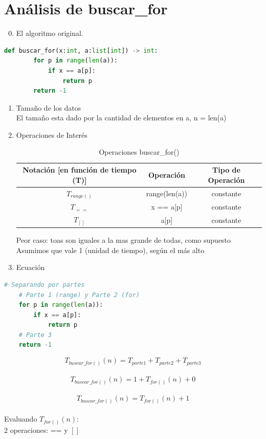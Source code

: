 \documentclass[stu, 12pt, letterpaper, donotrepeattitle, floatsintext, natbib, helv]{apa7}
\begin{document}
\section{Análisis de buscar\_for}
\begin{enumerate}
    \setcounter{enumi}{-1}
    \item El algoritmo original.
\end{enumerate}
\begin{lstlisting}[language=Python]
    def buscar_for(x:int, a:list[int]) -> int:
        for p in range(len(a)):
            if x == a[p]:
                return p
        return -1
\end{lstlisting}
\begin{enumerate}
    \setcounter{enumi}{0}
    \item Tamaño de los datos \\
El tamaño esta dado por la cantidad de elementos en a, n = len(a)
    \item Operaciones de Interés \\
    \begin{table} [h]
        \centering
        \begin{tabular}{|c c c|} 
         \hline
         Notación [en función de tiempo (T)] & Operación & Tipo de Operación \\ [0.5ex] 
         \hline\hline
         $T_{range()}$ & range(len(a)) & constante \\ 
         \hline
         $T_{==}$ & x == a[p] & constante \\
         \hline
         $T_{[]}$ & a[p] & constante \\
         \hline
        \end{tabular}
        \caption {Operaciones buscar\_for()}
        \label{tab:tablefor}
    \end{table}
        Peor caso: toas son iguales a la mas grande de todas, como supuesto \\
        Asumimos que vale 1 (unidad de tiempo), según el más alto
    \item Ecuación
    \end{enumerate}
\begin{lstlisting}[language=Python]
    # Separando por partes
    # Parte 1 (range) y Parte 2 (for)
    for p in range(len(a)):
        if x == a[p]:
            return p
    # Parte 3
    return -1
\end{lstlisting}

\[T_{buscar\_for()}(n) = T_{parte1} + T_{parte2} + T_{parte3}\] \\ 
\[T_{buscar\_for()}(n) = 1 + T_{for()}(n) + 0\] \\
\[T_{buscar\_for()}(n) = T_{for()}(n) + 1\] \\
Evaluando $T_{for()}(n)$: \\
2 operaciones: == y $[]$
\end{document}
